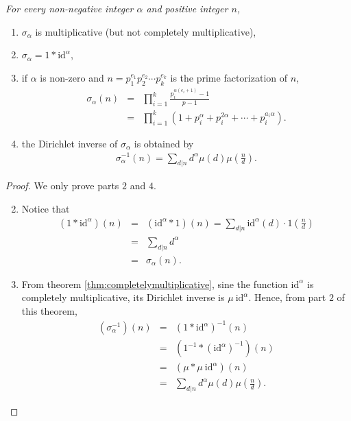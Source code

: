 \documentclass[12pt]{subfile}
\begin{document}
	\begin{theorem}\slshape
		For every non-negative integer $\alpha$ and positive integer $n$,
			\begin{enumerate}
				\item $\sigma_\alpha$ is multiplicative (but not completely multiplicative),
				\item $\sigma_\alpha = 1 \ast \text{id}^\alpha$,
				\item if $\alpha$ is non-zero and $n=p_1^{e_1}p_2^{e_2}\cdots p_k^{e_k}$ is the prime factorization of $n$,
					\begin{eqnarray*}
						\sigma_\alpha(n) &=& \prod_{i=1}^{k} \frac{p_i^{\alpha(e_i+1)}-1}{p-1}\\
									 &=& \prod_{i=1}^k \left(1 + p_i^\alpha + p_i^{2\alpha} + \cdots + p_i^{a_i \alpha}\right).
					\end{eqnarray*}
				\item the Dirichlet inverse of $\sigma_\alpha$ is obtained by
					\begin{align*}
						\sigma_\alpha^{-1} (n) = \sum_{d|n} d^\alpha\mu(d) \mu\left(\frac{n}{d}\right).
					\end{align*}
			\end{enumerate}
	\end{theorem}

	\begin{proof}
		We only prove parts $2$ and $4$.
			\begin{enumerate} \setcounter{enumi}{1}
				\item Notice that
					\begin{eqnarray*}
						(1 \ast \text{id}^\alpha)(n)
							&=& ( \text{id}^\alpha\ast 1)(n) = \sum_{d|n} \text{id}^\alpha (d) \cdot 1\left(\frac{n}{d}\right)\\
							&=& \sum_{d|n} d^\alpha \\
							&=& \sigma_\alpha (n).
					\end{eqnarray*}
				\setcounter{enumi}{3}
				\item From theorem \ref{thm:completelymultiplicative}, sine the function $\text{id}^\alpha$ is completely multiplicative, its Dirichlet inverse is $\mu \ \text{id}^\alpha$. Hence, from part $2$ of this theorem,
					\begin{eqnarray*}
						(\sigma_\alpha^{-1})(n)
									&=& \left(1 \ast \text{id}^\alpha\right)^{-1}(n)\\
									&=& \left(1^{-1} \ast  \left(\text{id}^\alpha\right)^{-1}\right)(n)\\
								    &=& \left(\mu \ast \mu \ \text{id}^\alpha\right)(n)\\
								    &=& \sum_{d|n} d^\alpha \mu(d) \mu\left(\frac{n}{d}\right).
					\end{eqnarray*}
			\end{enumerate}
	\end{proof}
\end{document}
